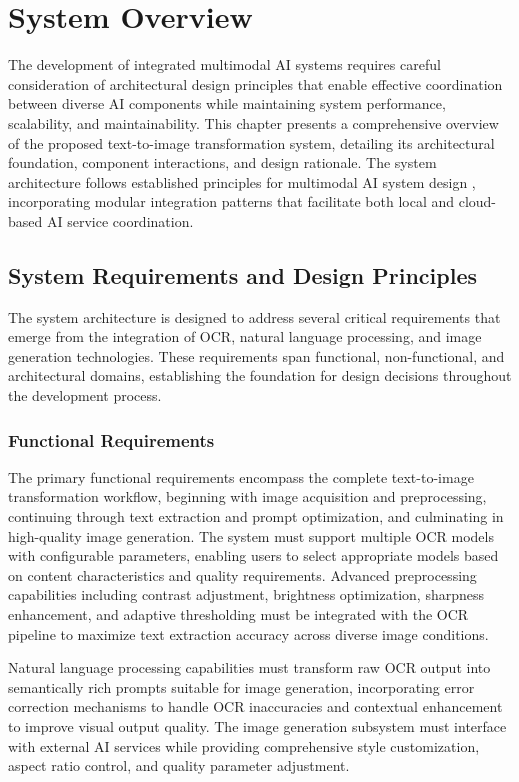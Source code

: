 \chapter{System Overview}

The development of integrated multimodal AI systems requires careful consideration of architectural design principles that enable effective coordination between diverse AI components while maintaining system performance, scalability, and maintainability. This chapter presents a comprehensive overview of the proposed text-to-image transformation system, detailing its architectural foundation, component interactions, and design rationale. The system architecture follows established principles for multimodal AI system design \cite{li2024generalist}, incorporating modular integration patterns that facilitate both local and cloud-based AI service coordination.

\section{System Requirements and Design Principles}

The system architecture is designed to address several critical requirements that emerge from the integration of OCR, natural language processing, and image generation technologies. These requirements span functional, non-functional, and architectural domains, establishing the foundation for design decisions throughout the development process.

\subsection{Functional Requirements}

The primary functional requirements encompass the complete text-to-image transformation workflow, beginning with image acquisition and preprocessing, continuing through text extraction and prompt optimization, and culminating in high-quality image generation. The system must support multiple OCR models with configurable parameters, enabling users to select appropriate models based on content characteristics and quality requirements. Advanced preprocessing capabilities including contrast adjustment, brightness optimization, sharpness enhancement, and adaptive thresholding must be integrated with the OCR pipeline to maximize text extraction accuracy across diverse image conditions.

Natural language processing capabilities must transform raw OCR output into semantically rich prompts suitable for image generation, incorporating error correction mechanisms to handle OCR inaccuracies and contextual enhancement to improve visual output quality. The image generation subsystem must interface with external AI services while providing comprehensive style customization, aspect ratio control, and quality parameter adjustment.

